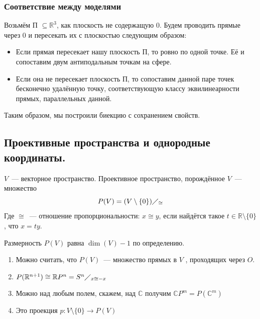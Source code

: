 \documentclass[11pt]{report}
\begin{document}
    \subsubsection*{Соответствие между моделями}

    Возьмём П $\subseteq \mathbb{R}^3$, как плоскость не содержащую $0$. Будем проводить прямые через $0$ и пересекать их с плоскостью следующим образом:
    \begin{itemize}
        \item Если прямая пересекает нашу плоскость П, то ровно по одной точке. Её и сопоставим двум антиподальным точкам на сфере.
        \item Если она не пересекает плоскость П, то сопоставим данной паре точек бесконечно удалённую точку, соответствующую классу эквилинеарности прямых, параллельных данной.
    \end{itemize}

    \begin{remark}
        Таким образом, мы построили биекцию с сохранением свойств.
    \end{remark}
    \subsection{Проективные пространства и однородные координаты.}
    \begin{definition}
        $V$~--- векторное пространство. Проективное пространство, порождённое $V$~--- множество
        \begin{equation*}
            P(V) = (V \setminus \{0\}) \diagup_{\cong}
        \end{equation*}
        Где $\cong$~--- отношение пропорциональности: $x \cong y$, если найдётся такое $t \in \mathbb{R} \setminus \{0\}$, что $x = ty$.
    \end{definition}

    \begin{remark}
        Размерность $P(V)$ равна $\dim(V) - 1$ по определению.
    \end{remark}

    \begin{remark}
        \begin{enumerate}
            \item Можно считать, что $P(V)$~--- множество прямых в $V$ , проходящих через $O$.
            \item $P(\mathbb{R}^{n + 1}) \cong \mathbb{R}P^{n} = S^n \diagup_{x \cong -x}$
            \item Можно над любым полем, скажем, над $\mathbb{C}$ получим $\mathbb{C}P^m = P(\mathbb{C}^m)$
            \item Это проекция $p: V \setminus \{0\} \to P(V)$
        \end{enumerate}
    \end{remark}
\end{document}
